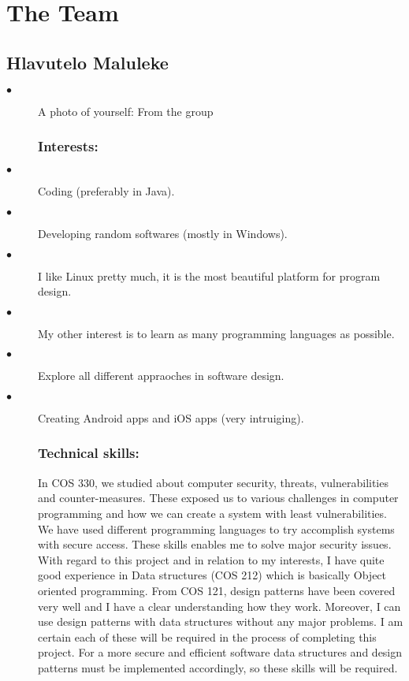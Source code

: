 \documentclass[12pt]{article}
\begin{document}


\newpage


\pagebreak

\section{The Team}


\subsection{Hlavutelo Maluleke}

\begin{description}
  \item[$\bullet$] A photo of yourself: From the group
  \subsubsection{Interests:}
  
   \item[$\bullet$] Coding (preferably in Java).
	 \item[$\bullet$] Developing random softwares (mostly in Windows).
	 \item[$\bullet$] I like Linux pretty much, it is the most beautiful platform for program design.
	 \item[$\bullet$] My other interest is to learn as many programming languages as possible.
	 \item[$\bullet$] Explore all different appraoches in software design.
	 \item[$\bullet$] Creating Android apps and iOS apps (very intruiging).
	 
	\subsubsection{Technical skills:}
	
	In COS 330, we studied about computer security, threats, vulnerabilities and counter-measures. These exposed us to various challenges in computer programming and how we can create a system with least vulnerabilities. We have used different programming languages to try accomplish systems with secure access. These skills enables me to solve major security issues.\\

	With regard to this project and in relation to my interests, I have quite good experience in Data structures (COS 212) which is basically Object oriented programming. From COS 121, design patterns have been covered very well and I have a clear understanding how they work. Moreover, I can use design patterns with data structures without any major problems. I am certain each of these will be required in the process of completing this project. For a more secure and efficient software data structures and design patterns must be implemented accordingly, so these skills will be required.
	

\end{description}
\end{document}
